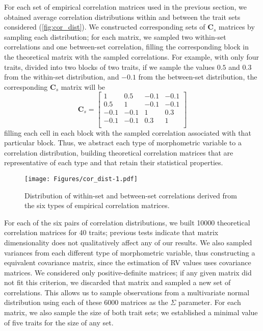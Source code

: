 \documentclass[12pt,]{article}
\begin{document}
For each set of empirical correlation matrices used in the previous
section, we obtained average correlation distributions within and
between the trait sets considered (\autoref{fig:cor_dist}). We
constructed corresponding sets of $\mathbf{C}_{s}$ matrices by sampling
each distribution; for each matrix, we sampled two within-set
correlations and one between-set correlation, filling the corresponding
block in the theoretical matrix with the sampled correlations. For
example, with only four traits, divided into two blocks of two traits,
if we sample the values $0.5$ and $0.3$ from the within-set
distribution, and $-0.1$ from the between-set distribution, the
corresponding $\mathbf{C}_{s}$ matrix will be \[
\mathbf{C}_s =
\begin{bmatrix}
1 & 0.5 & -0.1 & -0.1 \\
0.5 & 1 & -0.1 & -0.1 \\
-0.1 & -0.1 & 1 & 0.3 \\
-0.1 & -0.1 & 0.3 & 1 \\
\end{bmatrix}
\] filling each cell in each block with the sampled correlation
associated with that particular block. Thus, we abstract each type of
morphometric variable to a correlation distribution, building
theoretical correlation matrices that are representative of each type
and that retain their statistical properties.

\begin{figure}[htbp]
\centering
\texttt{[image: Figures/cor\_dist-1.pdf]}
\caption{Distribution of within-set and between-set correlations derived
from the six types of empirical correlation matrices.
\label{fig:cor_dist}}
\end{figure}

For each of the six pairs of correlation distributions, we built 10000
theoretical correlation matrices for 40 traits; previous tests indicate
that matrix dimensionality does not qualitatively affect any of our
results. We also sampled variances from each different type of
morphometric variable, thus constructing a equivalent covariance matrix,
since the estimation of RV values uses covariance matrices. We
considered only positive-definite matrices; if any given matrix did not
fit this criterion, we discarded that matrix and sampled a new set of
correlations. This allows us to sample observations from a multivariate
normal distribution using each of these 6000 matrices as the $\Sigma$
parameter. For each matrix, we also sample the size of both trait sets;
we established a minimal value of five traits for the size of any set.
\end{document}
